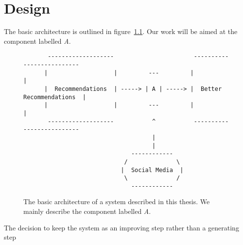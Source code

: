 
\chapter{Design} %

\label{Chapter4} %



% 
% 

The basic architecture is outlined in figure~\ref{fig:1_basic_architecture}. Our work will be aimed at the component labelled \emph{A}.

\begin{figure}[h]
  \centering
    \begin{verbatim}
       -------------------                       --------------------------
      |                   |         ---         |                          |
      |  Recommendations  | -----> | A | -----> |  Better Recommendations  |
      |                   |         ---         |                          |
       -------------------           ^           --------------------------
                                     |
                                     |
                               ------------
                             /              \
                            |  Social Media  |
                             \              /
                               ------------
    \end{verbatim}
  \caption{The basic architecture of a system described in this thesis. We mainly describe the component labelled \emph{A}.}
  \label{fig:1_basic_architecture}
\end{figure}

The decision to keep the system as an improving step rather than a generating step

